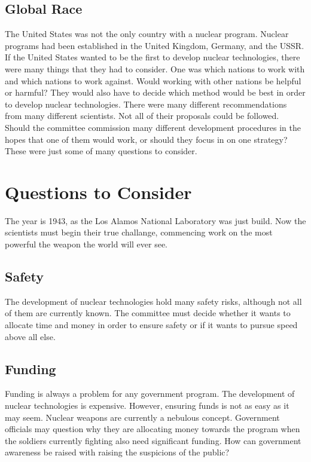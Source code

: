 \documentclass[11 pt, twoside]{article}
\begin{document}
\subsection{Global Race}
	The United States was not the only country with a nuclear program. Nuclear programs had been established in the United Kingdom, Germany, and the USSR. If the United States wanted to be the first to develop nuclear technologies, there were many things that they had to consider. One was which nations to work with and which nations to work against. Would working with other nations be helpful or harmful? They would also have to decide which method would be best in order to develop nuclear technologies. There were many different recommendations from many different scientists. Not all of their proposals could be followed. Should the committee commission many different development procedures in the hopes that one of them would work, or should they focus in on one strategy? These were just some of many questions to consider. 

\section{Questions to Consider}

The year is 1943, as the Los Alamos National Laboratory was just build. Now the scientists must begin their true challange, commencing work on the most powerful the weapon the world will ever see.

\subsection{Safety}
The development of nuclear technologies hold many safety risks, although not all of them are currently known. The committee must decide whether it wants to allocate time and money in order to ensure safety or if it wants to pursue speed above all else.

\subsection{Funding}
Funding is always a problem for any government program. The development of nuclear technologies is expensive. However, ensuring funds is not as easy as it may seem. Nuclear weapons are currently a nebulous concept. Government officials may question why they are allocating money towards the program when the soldiers currently fighting also need significant funding. How can government awareness be raised with raising the suspicions of the public? 
\end{document}
